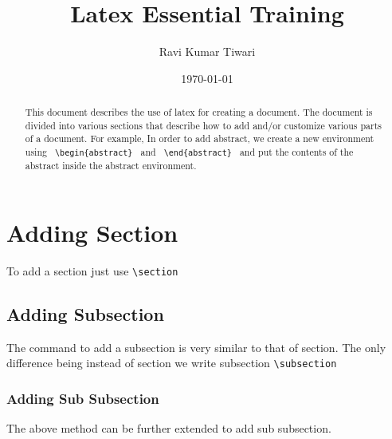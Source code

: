 \documentclass{article}
\begin{document}
\title{Latex Essential Training}
\author{Ravi Kumar Tiwari}
\date{\today}
\maketitle



\begin{abstract}
This document describes the use of latex for creating a document. The document is divided into various sections that describe
how to add and/or customize various parts of a document. For example, In order to add abstract, we create a new environment 
using \verb+ \begin{abstract} + and \verb+ \end{abstract} + and put the contents of the abstract inside the abstract environment.
\end{abstract}

\newpage
\tableofcontents

\newpage
\listoftables
\listoffigures
\newpage

\section{Adding Section}
To add a section just use \verb+\section +

\subsection{Adding Subsection}
The command to add a subsection is very similar to that of section. The only difference being instead of 
section we write subsection \verb+\subsection +

\subsubsection{Adding Sub Subsection}
The above method can be further extended to add sub subsection. 








\end{document}
